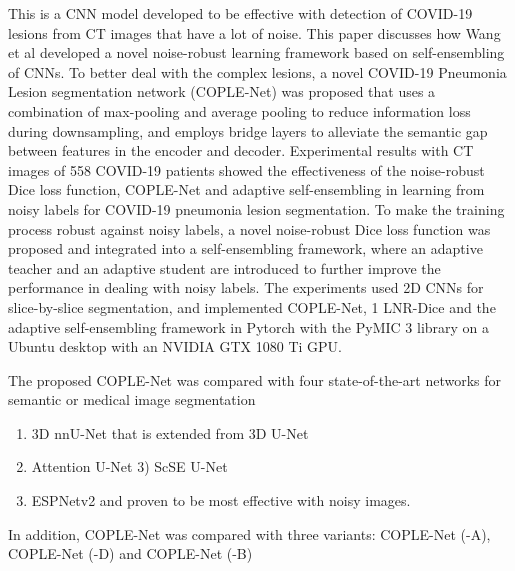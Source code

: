 \documentclass{sigkddExp}
\begin{document}
This is a CNN model \cite{wang2020covidnet} developed to be effective with
detection of COVID-19 lesions from CT images that have a lot of noise. This
paper discusses how Wang et al developed a novel noise-robust learning framework
based on self-ensembling of CNNs.  To better deal with the complex lesions, a
novel COVID-19 Pneumonia Lesion segmentation network (COPLE-Net) was proposed
that uses a combination of max-pooling and average pooling to reduce information
loss during downsampling, and employs bridge layers to alleviate the semantic
gap between features in the encoder and decoder. Experimental results with CT
images of 558 COVID-19 patients showed the effectiveness of the noise-robust
Dice loss function, COPLE-Net and adaptive self-ensembling in learning from
noisy labels for COVID-19 pneumonia lesion segmentation. To make the training
process robust against noisy labels, a novel noise-robust Dice loss function was
proposed and integrated into a self-ensembling framework, where an adaptive
teacher and an adaptive student are introduced to further improve the
performance in dealing with noisy labels. The experiments used 2D CNNs for
slice-by-slice segmentation, and implemented COPLE-Net, 1 LNR-Dice and the
adaptive self-ensembling framework in Pytorch with the PyMIC 3 library on a
Ubuntu desktop with an NVIDIA GTX 1080 Ti GPU. 

The proposed COPLE-Net was compared with four state-of-the-art networks for semantic or medical
image segmentation

\begin{enumerate}
    \item 3D nnU-Net that is extended from 3D U-Net
    \item Attention U-Net 3) ScSE U-Net
    \item ESPNetv2 and proven to be most effective with noisy images.
\end{enumerate}

In addition, COPLE-Net was compared with three variants: COPLE-Net (-A), COPLE-Net (-D)
and COPLE-Net (-B) 

%
\end{document}
